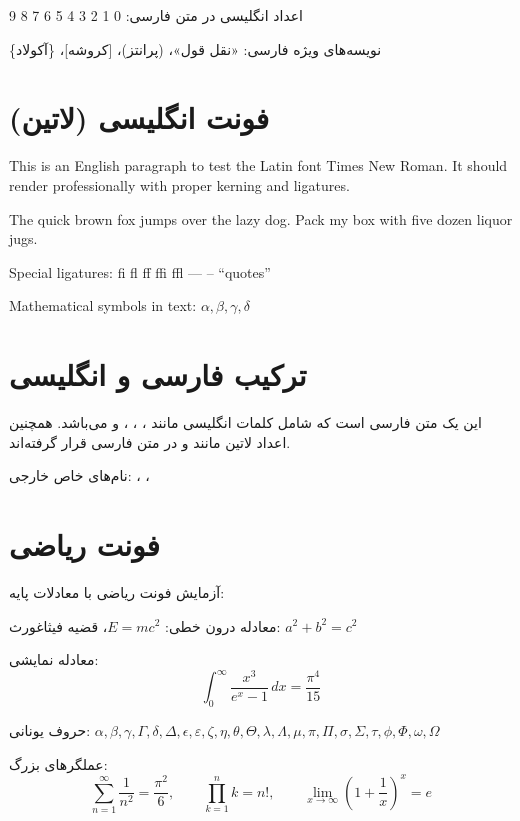 \documentclass{matinbook}
\begin{document}
اعداد انگلیسی در متن فارسی: 0 1 2 3 4 5 6 7 8 9

نویسه‌های ویژه فارسی: «نقل قول»، (پرانتز)، [کروشه]، \{آکولاد\}

\section{فونت انگلیسی (لاتین)}

\begin{latin}
This is an English paragraph to test the Latin font Times New Roman.
It should render professionally with proper kerning and ligatures.

The quick brown fox jumps over the lazy dog.
Pack my box with five dozen liquor jugs.

Special ligatures: fi fl ff ffi ffl --- -- ``quotes''

Mathematical symbols in text: \( \alpha, \beta, \gamma, \delta \)
\end{latin}

\section{ترکیب فارسی و انگلیسی}

این یک متن فارسی است که شامل کلمات انگلیسی مانند ،
، ،  و  می‌باشد.
همچنین اعداد لاتین مانند  و  در متن فارسی قرار گرفته‌اند.

نام‌های خاص خارجی: ، ، 

\section{فونت ریاضی}

آزمایش فونت ریاضی  با معادلات پایه:

معادله درون خطی: $E = mc^2$، قضیه فیثاغورث: $a^2 + b^2 = c^2$

معادله نمایشی:
\begin{equation}
    \int_{0}^{\infty} \frac{x^3}{e^x - 1} \,dx = \frac{\pi^4}{15}
    \label{eq:stefan-boltzmann}
\end{equation}

حروف یونانی: $\alpha, \beta, \gamma, \Gamma, \delta, \Delta, \epsilon, \varepsilon,
\zeta, \eta, \theta, \Theta, \lambda, \Lambda, \mu, \pi, \Pi, \sigma, \Sigma, \tau,
\phi, \Phi, \omega, \Omega$

عملگرهای بزرگ:
\[
    \sum_{n=1}^{\infty} \frac{1}{n^2} = \frac{\pi^2}{6}, \qquad
    \prod_{k=1}^{n} k = n!, \qquad
    \lim_{x \to \infty} \left(1 + \frac{1}{x}\right)^x = e
\]
\end{document}
